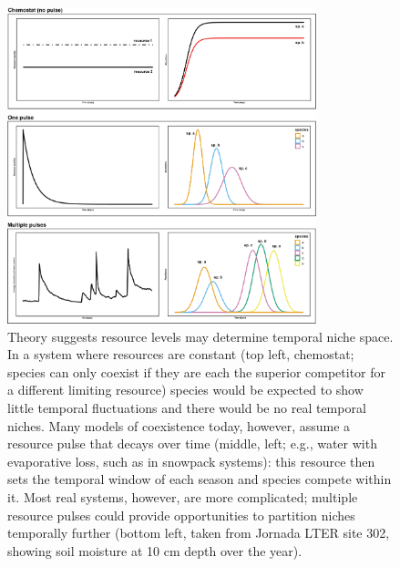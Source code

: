 \documentclass[11pt]{article}
\begin{document}
\begin{figure}[h!]
\centering
\includegraphics[width=0.8\textwidth]{..//figures/figsubmit/sixpanel_concept_increasespp.png}
\caption{Theory suggests resource levels may determine temporal niche space. In a system where resources are constant (top left, chemostat; species can only coexist if they are each the superior competitor for a different limiting resource) species would be expected to show little temporal fluctuations and there would be no real temporal niches. Many models of coexistence today, however, assume a resource pulse that decays over time (middle, left; e.g., water with evaporative loss, such as in snowpack systems): this resource then sets the temporal window of each season and species compete within it. Most real systems, however, are more complicated; multiple resource pulses could provide opportunities to partition niches temporally further (bottom left, taken from Jornada LTER site 302, showing soil moisture at 10 cm depth over the year).} 

 \label{fig:resource}
\end{figure}
\end{document}
